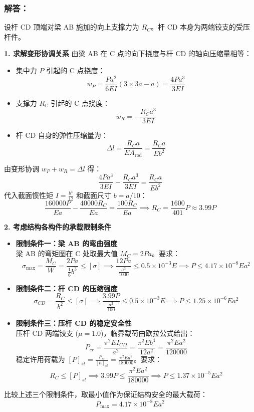 \documentclass[11pt,a4paper]{ctexrep}
\begin{document}
{\begin{center}
\end{center}

\subsubsection*{解答：}

设杆 CD 顶端对梁 AB 施加的向上支撑力为 $R_C$。杆 CD 本身为两端铰支的受压杆件。

\textbf{1. 求解变形协调关系}
由梁 AB 在 C 点的向下挠度与杆 CD 的轴向压缩量相等：
\begin{itemize}
    \item 集中力 $P$ 引起的 C 点挠度：
    \[
    w_P = \frac{Pa^2}{6EI}(3 \times 3a - a) = \frac{4Pa^3}{3EI}
    \]
    \item 支撑力 $R_C$ 引起的 C 点挠度：
    \[
    w_R = -\frac{R_C a^3}{3EI}
    \]
    \item 杆 CD 自身的弹性压缩量为：
    \[
    \Delta l = \frac{R_C a}{EA_{\text{rod}}} = \frac{R_C a}{E b^2}
    \]
\end{itemize}
由变形协调 $w_P + w_R = \Delta l$ 得：
\[
\frac{4Pa^3}{3EI} - \frac{R_C a^3}{3EI} = \frac{R_C a}{E b^2}
\]
代入截面惯性矩 $I = \frac{b^4}{12}$ 和截面尺寸 $b = a/10$：
\[
\frac{160000 P}{E a} - \frac{40000 R_C}{E a} = \frac{100 R_C}{E a} \implies R_C = \frac{1600}{401}P \approx 3.99 P
\]

\textbf{2. 考虑结构各构件的承载限制条件}
\begin{itemize}
    \item \textbf{限制条件一：梁 AB 的弯曲强度} \\
    梁 AB 的弯矩图在 C 处取最大值 $M_C = 2Pa$。要求：
    \[
    \sigma_{\max} = \frac{M_C}{W} = \frac{2Pa}{\frac{1}{6}b^3} \le [\sigma] \implies \frac{12Pa}{\frac{a^3}{1000}} \le 0.5 \times 10^{-3} E \implies P \le 4.17 \times 10^{-8} Ea^2
    \]
    \item \textbf{限制条件二：杆 CD 的压缩强度} \\
    \[
    \sigma_{CD} = \frac{R_C}{b^2} \le [\sigma] \implies \frac{3.99 P}{\frac{a^2}{100}} \le 0.5 \times 10^{-3} E \implies P \le 1.25 \times 10^{-6} Ea^2
    \]
    \item \textbf{限制条件三：压杆 CD 的稳定安全性} \\
    压杆 CD 两端铰支 ($\mu = 1.0$)，临界载荷由欧拉公式给出：
    \[
    P_{cr} = \frac{\pi^2 EI_{CD}}{a^2} = \frac{\pi^2 E b^4}{12 a^2} = \frac{\pi^2 E a^2}{120000}
    \]
    稳定许用荷载为 $[P]_{st} = \frac{P_{cr}}{[n]_{st}} = \frac{\pi^2 E a^2}{180000}$。要求：
    \[
    R_C \le [P]_{st} \implies 3.99 P \le \frac{\pi^2 E a^2}{180000} \implies P \le 1.37 \times 10^{-5} Ea^2
    \]
\end{itemize}

比较上述三个限制条件，取最小值作为保证结构安全的最大载荷：
\[
P_{\max} = 4.17 \times 10^{-8} Ea^2
\]


}
\end{document}

